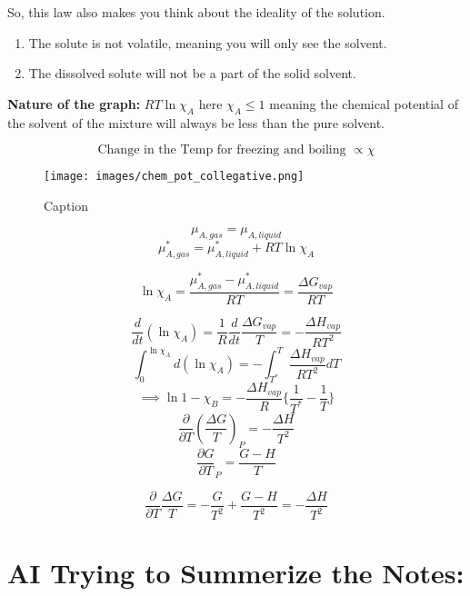 \documentclass{article}
\theoremstyle{definition}
\begin{document}
So, this law also makes you think about the ideality of the solution.

\begin{enumerate}
    \item The solute is not volatile, meaning you will only see the solvent.
    \item The dissolved solute will not be a part of the solid solvent.
\end{enumerate}




\textbf{Nature of the graph:} $RT\ln{\chi_A}$ here $\chi_A \leq 1$ meaning the chemical potential of the solvent of the mixture will always be less than the pure solvent.

\[
\text{Change in the Temp for freezing and boiling } \propto \chi
\]

\begin{figure}
    \centering
    \texttt{[image: images/chem\_pot\_collegative.png]}
    \caption{Caption}
    \label{fig:enter-label}
\end{figure}

\[
\mu_{A,gas} = \mu_{A, liquid}
\]
\[
\mu_{A,gas}^* = \mu_{A,liquid}^* + RT\ln{\chi_A}
\]

\[
\ln{\chi_A} = \frac{\mu_{A,gas}^* - \mu_{A,liquid}^*}{RT} = \frac{\Delta G_{vap}}{RT}
\]

\[
\frac{d}{dt}(\ln{\chi_A}) = \frac{1}{R} \frac{d}{dt} \frac{\Delta G_{vap}}{T} = - \frac{\Delta H_{vap}}{RT^2}
\]
\[
\int_0^{\ln{\chi_A}} d(\ln{\chi_A}) = - \int_{T^*}^{T} \frac{\Delta H_{vap}}{RT^2} dT
\]
\[
\implies \ln{1-\chi_B} =  -\frac{\Delta H_{vap}}{R}\{\frac{1}{T^*}- \frac{1}{T}\}
\]
\[
\frac{\partial }{\partial T}(\frac{\Delta G}{T})_P = - \frac{\Delta H}{T^2}
\]
\[
\frac{\partial G}{\partial T}_P = \frac{G-H}{T}
\]

\[
\frac{\partial}{\partial T} \frac{\Delta G}{T} = -\frac{G}{T^2} + \frac{G-H}{T^2} = -\frac{\Delta H}{T^2}
\]

\section{AI Trying to Summerize the Notes:}
\end{document}
